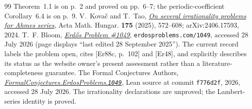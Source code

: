 \documentclass[11pt]{article}
\begin{document}
\begin{thebibliography}{99}
  Theorem~1.1 is on p.~2 and proved on pp.~6--7; the periodic-coefficient
  Corollary~6.4 is on p.~9.
 V.~Kova\v{c} and T.~Tao,
  \href{https://arxiv.org/abs/2406.17593}{\emph{On several irrationality
  problems for Ahmes series}}, Acta Math. Hungar. \textbf{175} (2025),
  572--608; arXiv:2406.17593, 2024.
 T.~F. Bloom,
  \href{https://www.erdosproblems.com/1049}{\emph{Erd\H{o}s Problem \#1049}},
  \texttt{erdosproblems.com/1049}, accessed 28 July 2026
  (page displays ``last edited 28 September 2025'').  The current record
  labels the problem open, cites \textup{[Er88c, p.~102]} and \textup{[Er48]},
  and explicitly describes its status as the website owner's present
  assessment rather than a literature-completeness guarantee.
 The Formal Conjectures Authors,
  \href{https://github.com/google-deepmind/formal-conjectures/blob/f776d2f2039351b00737ffcafb9d7d7666e1d9af/FormalConjectures/ErdosProblems/1049.lean}
  {\emph{FormalConjectures.ErdosProblems.\texttt{1049}}},
  Lean source at commit \texttt{f776d2f}, 2026, accessed 28 July 2026.  The
  irrationality declarations are unproved; the Lambert-series identity is
  proved.
\end{thebibliography}
\end{document}
